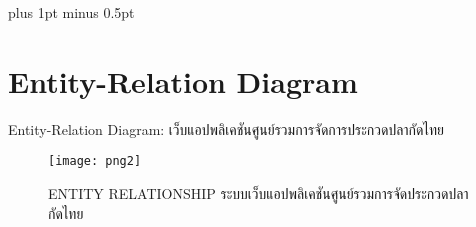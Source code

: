 
\clearpage
\thispagestyle{plain}

\begingroup
\fontsize{16pt}{19.2pt}\selectfont
\justifying
\XeTeXlinebreakskip=0pt plus 1pt minus 0.5pt
\setlength{\parindent}{1.5cm}
\setlength{\parskip}{0pt}


\section*{Entity-Relation Diagram}

\indent Entity-Relation Diagram: เว็บแอปพลิเคชันศูนย์รวมการจัดการประกวดปลากัดไทย

\vspace{\baselineskip}

\begin{figure}[h]
	\centering
	\texttt{[image: png2]}
	\caption{ENTITY RELATIONSHIP ระบบเว็บแอปพลิเคชันศูนย์รวมการจัดประกวดปลากัดไทย}
\end{figure}

\clearpage